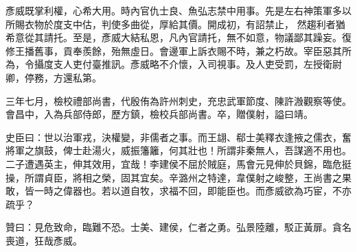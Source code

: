 \begin{pinyinscope}
 彥威既掌利權，心希大用。時內官仇士良、魚弘志禁中用事。先是左右神策軍多以所賜衣物於度支中估，判使多曲從，厚給其價。開成初，有詔禁止，
 然趨利者猶希意從其請托。至是，彥威大結私恩，凡內官請托，無不如意，物議鄙其躁妄。復修王播舊事，貢奉羨餘，殆無虛日。會邊軍上訴衣賜不時，兼之朽故。宰臣惡其所為，令攝度支人吏付臺推訊。彥威略不介懷，入司視事。及人吏受罰，左授衛尉卿，停務，方還私第。



 三年七月，檢校禮部尚書，代殷侑為許州刺史，充忠武軍節度、陳許溵觀察等使。會昌中，入為兵部侍郎，歷方鎮，檢校兵部尚書。卒，贈僕射，謚曰靖。



 史臣曰：世以治軍戎，決權變，非儒者之事。而王翃、郗士美釋衣逢掖之儒衣，奮將軍之旗鼓，俾士赴湯火，威振籓籬，何其壯也！所謂非秦無人，吾謀適不用也。二子遭遇英主，伸其效用，宜哉！李建侯不屈於賊庭，馬會元見伸於貝錦，臨危挺操，所謂貞臣，將相之榮，固其宜矣。辛潞州之特達，韋僕射之峻整，王尚書之果敢，皆一時之偉器也。若以道自牧，求福不回，即能臣也。而彥威欲為巧宦，不亦疏乎？



 贊曰：見危致命，臨難不恐。士美、建侯，仁者之勇。弘景陸離，駁正黃扉。貪名喪道，狂哉彥威。



\end{pinyinscope}